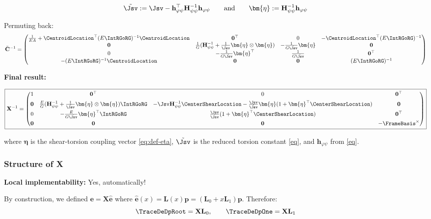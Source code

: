 \[\tilde{\Jsv} := \Jsv - \mathbf{h}_{\varphi\psi}^\top\mathbf{H}_{\psi\psi}^{-1}\mathbf{h}_{\varphi\psi}
\qquad\text{and}\qquad 
\bm{\eta} := \mathbf{H}_{\psi\psi}^{-1}\mathbf{h}_{\varphi\psi}
\]


Permuting back: \[\bar{\mathbf{C}}^{-1} = \begin{pmatrix}
\frac{1}{EA} + \CentroidLocation^\top(E\IntRGoRG)^{-1}\CentroidLocation & \mathbf{0}^\top & 0 & -\CentroidLocation^\top(E\IntRGoRG)^{-1} \\
\mathbf{0} & \frac{1}{G}(\mathbf{H}_{\psi\psi}^{-1} + \frac{1}{\tilde{\Jsv}}\bm{\eta}\otimes\bm{\eta}) & -\frac{1}{G\tilde{\Jsv}}\bm{\eta} & \mathbf{0} \\
0 & -\frac{1}{G\tilde{\Jsv}}\bm{\eta}^\top & \frac{1}{G\tilde{\Jsv}} & \mathbf{0}^\top \\
-(E\IntRGoRG)^{-1}\CentroidLocation & \mathbf{0} & \mathbf{0} & (E\IntRGoRG)^{-1}
\end{pmatrix}\]

\textbf{Final result:}

\[
\boxed{\mathbf{X}^{-1} = \begin{pmatrix}
1 & \mathbf{0}^\top & 0 & \mathbf{0}^\top \\[4pt]
\mathbf{0} & \frac{E}{G}(\mathbf{H}_{\psi\psi}^{-1} + \frac{1}{\tilde{\Jsv}}\bm{\eta}\otimes\bm{\eta})\IntRGoRG & -\Jsv\mathbf{H}_{\psi\psi}^{-1}\CenterShearLocation - \frac{\Jsv}{\tilde{\Jsv}}\bm{\eta}(1 + \bm{\eta}^\top\CenterShearLocation) & \mathbf{0} \\[4pt]
0 & -\frac{E}{G\tilde{\Jsv}}\bm{\eta}^\top\IntRGoRG & \frac{\Jsv}{\tilde{\Jsv}}(1 + \bm{\eta}^\top\CenterShearLocation) & \mathbf{0}^\top \\[4pt]
\mathbf{0} & \mathbf{0} & \mathbf{0} & -\FrameBasis^\times
\end{pmatrix}}\]

where 
\(\bm{\eta}\) is
the shear-torsion coupling vector \eqref{eq:def-eta}, 
\(\tilde{\Jsv}\)
is the reduced torsion constant \eqref{eq}, and 
\(\mathbf{h}_{\varphi\psi}\) from \eqref{eq}.

\subsubsection{Structure of X}

\textbf{Local implementability:} Yes, automatically!

By construction, we defined \(\bm{e} = \mathbf{X}\hat{\bm{e}}\) where
\(\hat{\bm{e}}(x) = \mathbf{L}(x)\bm{p} = (\mathbf{L}_0 + x\mathbf{L}_1)\bm{p}\).
Therefore:
\[\TraceDeDpRoot = \mathbf{X}\mathbf{L}_0, \qquad \TraceDeDpOne = \mathbf{X}\mathbf{L}_1\]

